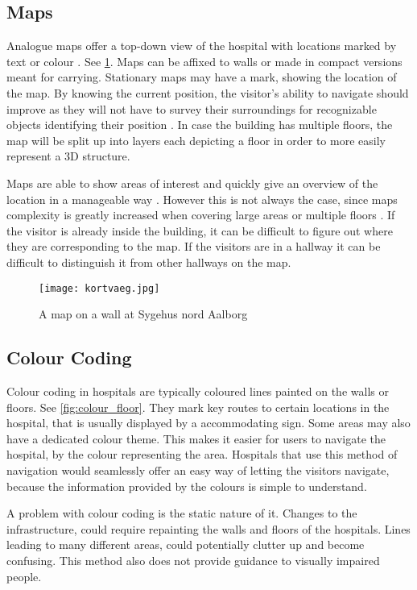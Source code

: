 \subsection{Maps} \label{sub:map}
Analogue maps \cite{map} offer a top-down view of the hospital with locations marked by text or colour \cite{art_Osborne}. See \cref{fig:map}. Maps can be affixed to walls or made in compact versions meant for carrying. Stationary maps may have a mark, showing the location of the map. By knowing the current position, the visitor's ability to navigate should improve as they will not have to survey their surroundings for recognizable objects identifying their position \cite{map_survey}. In case the building has multiple floors, the map will be split up into layers each depicting a floor in order to more easily represent a 3D structure.

Maps are able to show areas of interest and quickly give an overview of the location in a manageable way \cite{pros_analog_map}. However this is not always the case, since maps complexity is greatly increased when covering large areas or multiple floors \cite{map_confusing}. If the visitor is already inside the building, it can be difficult to figure out where they are corresponding to the map. If the visitors are in a hallway it can be difficult to distinguish it from other hallways on the map.

  \begin{figure}[ht!]
  \centering
  \texttt{[image: kortvaeg.jpg]}
  \caption{A map on a wall at Sygehus nord Aalborg}
  \label{fig:map}
  \end{figure}

\subsection{Colour Coding}\label{sub:col}
Colour coding in hospitals are typically coloured lines painted on the walls or floors. See \cref{fig:colour_floor}. They mark key routes to certain locations in the hospital, that is usually displayed by a accommodating sign. Some areas may also have a dedicated colour theme. This makes it easier for users to navigate the hospital, by the colour representing the area.
Hospitals that use this method of navigation would seamlessly offer an easy way of letting the visitors navigate, because the information provided by the colours is simple to understand.

A problem with colour coding is the static nature of it. Changes to the infrastructure, could require repainting the walls and floors of the hospitals. Lines leading to many different areas, could potentially clutter up and become confusing. This method also does not provide guidance to visually impaired people.

